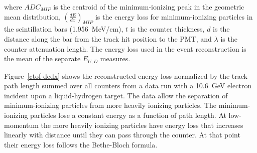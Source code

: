 \documentclass{elsart}
\begin{document}
\noindent
where $ADC_{MIP}$ is the centroid of the minimum-ionizing peak in the geometric mean distribution,
$\left( \frac{dE}{dx} \right)_{MIP}$ is the energy loss for minimum-ionizing particles in the scintillation
bars (1.956~MeV/cm), $t$ is the counter thickness, $d$ is the distance along the bar from the track hit
position to the PMT, and $\lambda$ is the counter attenuation length. The energy loss used in the event
reconstruction is the mean of the separate $E_{U,D}$ measures.

Figure~\ref{ctof-dedx} shows the reconstructed energy loss normalized by the track path length summed
over all counters from a data run with a 10.6~GeV electron incident upon a liquid-hydrogen target. The
data allow the separation of minimum-ionizing particles from more heavily ionizing particles. The
minimum-ionizing particles lose a constant energy as a function of path length. At low-momentum
the more heavily ionizing particles have energy loss that increases linearly with distance until they can pass
through the counter. At that point their energy loss follows the Bethe-Bloch formula.
\end{document}

